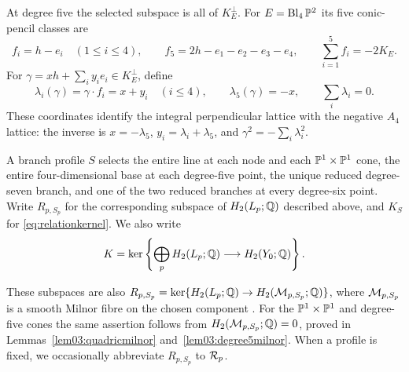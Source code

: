 At degree five the selected subspace is all of $K_E^\perp$.
For $E=\operatorname{Bl}_4\mathbb{P}^2$ its five conic-pencil classes are
\begin{equation}\label{eq:degree5pencils}
 f_i=h-e_i\quad(1\le i\le4),\qquad
 f_5=2h-e_1-e_2-e_3-e_4,\qquad \sum_{i=1}^5f_i=-2K_E.
\end{equation}
For $\gamma=xh+\sum_i y_i e_i\in K_E^\perp$, define
\begin{equation}\label{eq:degree5coordinates}
 \lambda_i(\gamma)=\gamma\cdot f_i=x+y_i\quad(i\le4),
 \qquad \lambda_5(\gamma)=-x,\qquad \sum_i\lambda_i=0.
\end{equation}
These coordinates identify the integral perpendicular lattice with
the negative $A_4$ lattice: the inverse is
$x=-\lambda_5$, $y_i=\lambda_i+\lambda_5$, and
$\gamma^2=-\sum_i\lambda_i^2$.

\begin{definition}\label{def:branchprofile}
A branch profile $S$ selects the entire line at each node and each
$\mathbb{P}^1\times\mathbb{P}^1$ cone, the entire four-dimensional base at
each degree-five point, the unique reduced
degree-seven branch, and one of the two reduced branches at every
degree-six point.  Write $R_{p,S_p}$ for the corresponding subspace of
$H_2(L_p;\mathbb{Q})$ described above, and $K_S$ for \eqref{eq:relationkernel}.
We also write
\begin{equation}\label{eq:fullrelationkernel}
 K=\ker\left\{\bigoplus_pH_2(L_p;\mathbb{Q})\longrightarrow H_2(Y_0;\mathbb{Q})\right\}.
\end{equation}
\end{definition}

These subspaces are also
$R_{p,S_p}=\ker\{H_2(L_p;\mathbb{Q})\to H_2(\mathcal{M}_{p,S_p};\mathbb{Q})\}$, where
$\mathcal{M}_{p,S_p}$ is a smooth Milnor fibre on the chosen component
\cite[Prop.~2.1 and Lem.~4.2]{PaperIV}.  For the
$\mathbb{P}^1\times\mathbb{P}^1$ and degree-five cones the same assertion follows
from $H_2(\mathcal{M}_{p,S_p};\mathbb{Q})=0$, proved in
Lemmas~\ref{lem03:quadricmilnor} and~\ref{lem03:degree5milnor}.
When a profile is fixed, we
occasionally abbreviate $R_{p,S_p}$ to $\mathcal{R}_p$.


